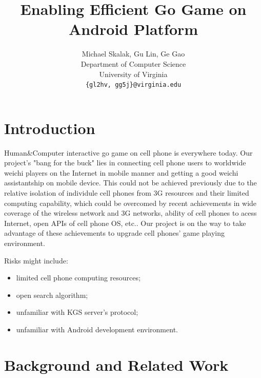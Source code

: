 \documentclass[acmtocl]{acmtrans2m}
\begin{document}
\title{Enabling Efficient Go Game on Android Platform} %
\author{
 Michael Skalak, Gu Lin, Ge Gao\\
Department of Computer Science\\
University of Virginia\\
\texttt{\{gl2hv, gg5j\}@virginia.edu}\\
}  %
\date{}  %

\maketitle

\begin{abstract}

\end{abstract}

\section{Introduction}
 
Human\&Computer interactive go game on cell phone is everywhere today. Our project's "bang for the buck" lies in connecting cell phone users to worldwide weichi players on the Internet in mobile manner and getting a good weichi assistantship on mobile device. This could not be achieved previously due to the relative isolation of individule cell phones from 3G resources and their limited computing capability, which could be overcomed by recent  achievements in wide coverage of the wireless network and 3G networks, ability of cell phones to acess Internet, open APIs of cell phone OS, etc.. Our project is on the way to take advantage of these achievements to upgrade cell phones' game playing environment.

Risks might include: 
 \begin{itemize}
  \item limited cell phone computing resources;
  \item open search algorithm;
  \item unfamiliar with KGS server's protocol;
  \item unfamiliar with Android development environment.
 \end{itemize}

\section{Background and Related Work}
\end{document}
